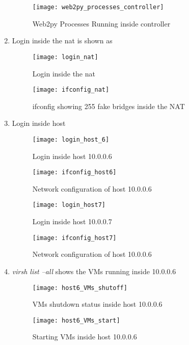 \begin{enumerate}
\begin{figure}
\caption{Web2py Processes Running inside controller}
\centering
\texttt{[image: web2py\_processes\_controller]}
\end{figure}

\newpage
\item Login inside the nat is shown as

\begin{figure}[h]
\caption{Login inside the nat}
\centering
\texttt{[image: login\_nat]}
\end{figure}


\begin{figure}[h]
\caption{ifconfig showing 255 fake bridges inside the NAT}
\centering
\texttt{[image: ifconfig\_nat]}
\end{figure}

\item Login inside host

\begin{figure}[h]
\caption{Login inside host 10.0.0.6}
\centering
\texttt{[image: login\_host\_6]}
\end{figure}


\begin{figure}[h]
\caption{Network configuration of host 10.0.0.6}
\centering
\texttt{[image: ifconfig\_host6]}
\end{figure}

\begin{figure}[h]
\caption{Login inside host 10.0.0.7}
\centering
\texttt{[image: login\_host7]}
\end{figure}


\begin{figure}[h]
\caption{Network configuration of host 10.0.0.6}
\centering
\texttt{[image: ifconfig\_host7]}

\end{figure}

\item \textit{virsh list --all} shows the VMs running inside 10.0.0.6

\begin{figure}[h]
\caption{VMs shutdown status inside host 10.0.0.6}
\centering
\texttt{[image: host6\_VMs\_shutoff]}

\end{figure}

\begin{figure}[h]
\caption{Starting VMs inside host 10.0.0.6}
\centering
\texttt{[image: host6\_VMs\_start]}


\end{figure}
\end{enumerate}
